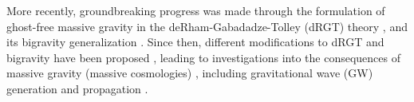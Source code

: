 \documentclass[prd,aps,psfig,nofootinbib,nobibnotes,superscriptaddress,preprintnumbers,times]{revtex4-2}\setlength{\topmargin}{-14mm}
\begin{document}
More recently, groundbreaking progress was made through the formulation of ghost-free massive gravity in the deRham-Gabadadze-Tolley (dRGT) theory \cite{deRham:2010ik,deRham:2010kj}, and its bigravity generalization \cite{Hassan:2011zd}. Since then, different modifications to dRGT and bigravity have been proposed \cite{Hinterbichler:2011tt,deRham:2014zqa,Koyama:2015vza,deRham:2016nuf,Hinterbichler:2016try, Cusin:2016ytz}, leading to investigations into the consequences of massive gravity (massive cosmologies) 
\cite{DAmico:2011eto,Gratia:2012wt,Gumrukcuoglu:2012aa,Maeda:2013bha,Akrami:2013pna,Zhang:2013noa,Lambiase:2012fv,Koyama:2011wx,Tasinato:2012ze,Solomon:2014iwa, Akrami:2013ffa,Koennig:2014ods,Gumrukcuoglu:2016hic}, 
including 
gravitational wave (GW) generation and propagation \cite{DeFelice:2013awa,Gumrukcuoglu:2013nza,DeFelice:2013bxa,DeFelice:2015moy,Babichev:2015xha,Sakstein:2017bws}. 
%
\end{document}
